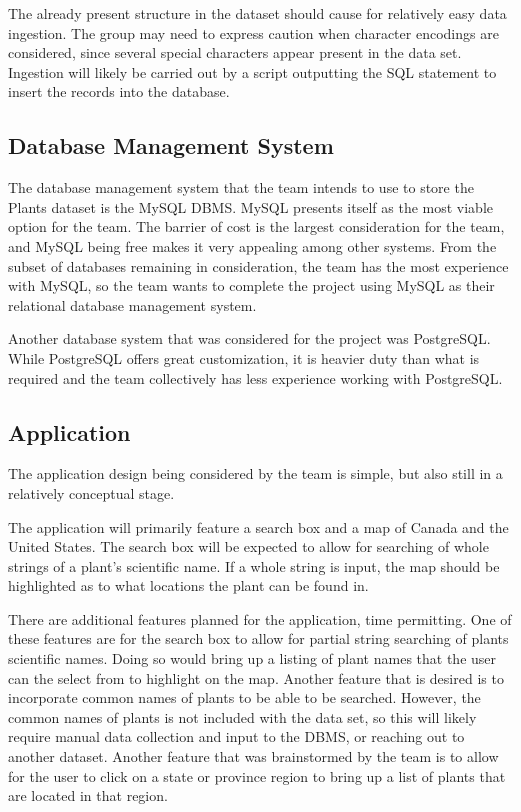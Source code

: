 \documentclass{Group6_Phase0}
\begin{document}
The already present structure in the dataset should cause for relatively easy data ingestion. The group may need to express caution when character encodings are considered, since several special characters appear present in the data set. Ingestion will likely be carried out by a script outputting the SQL statement to insert the records into the database.

\subsection{Database Management System}
The database management system that the team intends to use to store the Plants dataset is the MySQL DBMS. MySQL presents itself as the most viable option for the team. The barrier of cost is the largest consideration for the team, and MySQL being free makes it very appealing among other systems. From the subset of databases remaining in consideration, the team has the most experience with MySQL, so the team wants to complete the project using MySQL as their relational database management system.

Another database system that was considered for the project was PostgreSQL. While PostgreSQL offers great customization, it is heavier duty than what is required and the team collectively has less experience working with PostgreSQL.

\subsection{Application}
The application design being considered by the team is simple, but also still in a relatively conceptual stage.

The application will primarily feature a search box and a map of Canada and the United States. The search box will be expected to allow for searching of whole strings of a plant's scientific name. If a whole string is input, the map should be highlighted as to what locations the plant can be found in.

There are additional features planned for the application, time permitting. One of these features are for the search box to allow for partial string searching of plants scientific names. Doing so would bring up a listing of plant names that the user can the select from to highlight on the map. Another feature that is desired is to incorporate common names of plants to be able to be searched. However, the common names of plants is not included with the data set, so this will likely require manual data collection and input to the DBMS, or reaching out to another dataset. Another feature that was brainstormed by the team is to allow for the user to click on a state or province region to bring up a list of plants that are located in that region.
\end{document}
